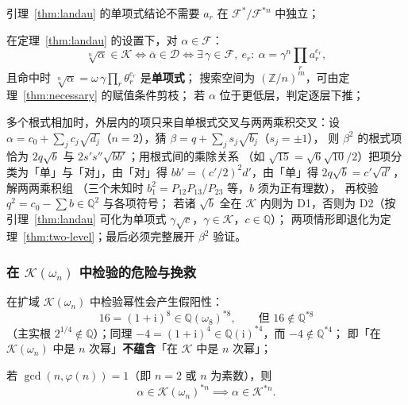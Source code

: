 \documentclass[UTF8,a4paper,11pt]{ctexart}
\newcommand{\ii}{\mathrm{i}}
\begin{document}
引理~\ref{thm:landau} 的单项式结论不需要 $a_r$ 在 $\mathscr{F}^*/\mathscr{F}^{*n}$ 中独立；\par

\begin{proposition}
在定理~\ref{thm:landau} 的设置下，对 $\alpha\in \mathscr{F}$：
\[
\sqrt[n]{\alpha}\in\mathscr{K}\iff\bar\alpha\in\mathscr{D}
\iff\exists\,\gamma\in \mathscr{F},\ e_r:\ \alpha=\gamma^n\prod_r a_r^{e_r},
\]
且命中时 $\sqrt[n]{\alpha}=\omega\,\gamma\prod_r\theta_r^{e_r}$ 是\textbf{单项式}；
搜索空间为 $(\mathbb{Z}/n)^m$，可由定理~\ref{thm:necessary} 的赋值条件剪枝；
若 $\alpha$ 位于更低层，判定逐层下推；
\end{proposition}

多个根式相加时，外层内的项只来自单根式交叉与两两乘积交叉：设
$\alpha=c_0+\sum_jc_j\sqrt{d_j}$（$n=2$），猜 $\beta=q+\sum_j s_j\sqrt{b_j}$（$s_j=\pm1$），
则 $\beta^2$ 的根式项恰为 $2q\sqrt b$ 与 $2s's''\sqrt{bb'}$；用根式间的乘除关系
（如 $\sqrt{15}=\sqrt6\sqrt{10}/2$）把项分类为「单」与「对」，由「对」得
$bb'=(c'/2)^2d'$，由「单」得 $2q\sqrt b=c'\sqrt{d'}$，解两两乘积组
（三个未知时 $b_1^2=P_{12}P_{13}/P_{23}$ 等，$b$ 须为正有理数），
再校验 $q^2=c_0-\sum b\in\mathbb{Q}^2$ 与各项符号；
若诸 $\sqrt b$ 全在 $\mathscr{K}$ 内则为 D1，否则为 D2（按引理~\ref{thm:landau}
可化为单项式 $\gamma\sqrt c$，$\gamma\in\mathscr{K}$，$c\in\mathbb{Q}$）；
两项情形即退化为定理~\ref{thm:two-level}；最后必须完整展开 $\beta^2$ 验证。\par

\subsubsection{在 $\mathscr{K}(\omega_n)$ 中检验的危险与挽救}

\begin{proposition}[$\omega$-陷阱]
\label{prop:trap}
在扩域 $\mathscr{K}(\omega_n)$ 中检验幂性会产生假阳性：
\[
16=(1+\ii)^8\in\mathbb{Q}(\omega_8)^{*8},\qquad\text{但 }16\notin\mathbb{Q}^{*8}
\]
（主实根 $2^{1/4}\notin\mathbb{Q}$）；同理
$-4=(1+\ii)^4\in\mathbb{Q}(\ii)^{*4}$，而 $-4\notin\mathbb{Q}^{*4}$；
即「在 $\mathscr{K}(\omega_n)$ 中是 $n$ 次幂」\textbf{不蕴含}「在 $\mathscr{K}$ 中是 $n$ 次幂」；
\end{proposition}

\begin{proposition}[挽救条件]
\label{prop:rescue}
若 $\gcd(n,\varphi(n))=1$（即 $n=2$ 或 $n$ 为素数），则
\[
\alpha\in\mathscr{K}(\omega_n)^{*n}\implies\alpha\in\mathscr{K}^{*n}.
\]
\end{proposition}
\end{document}
